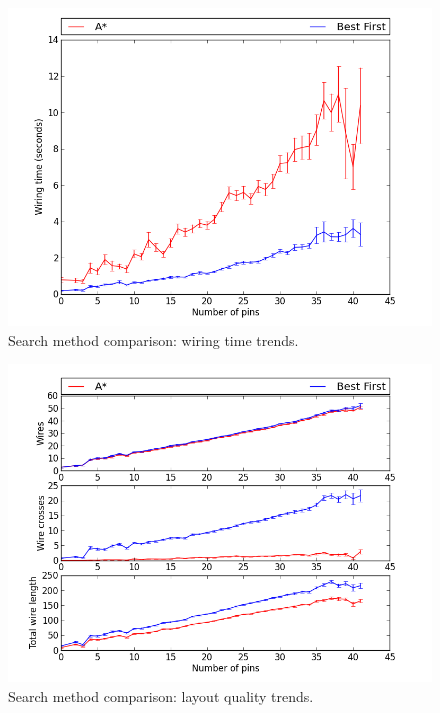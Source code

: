 \begin{figure}[H]
\begin{center}
\includegraphics[width=\textwidth]{Images/search_time_trend_comparison.png}
\caption{Search method comparison: wiring time trends.}
\label{fig:search_time_trend}
\end{center}
\end{figure}

\begin{figure}
\begin{center}
\includegraphics[width=\textwidth]{Images/search_quality_trend_comparison.png}
\caption{Search method comparison: layout quality trends.}
\label{fig:search_quality_trend}
\end{center}
\end{figure}


